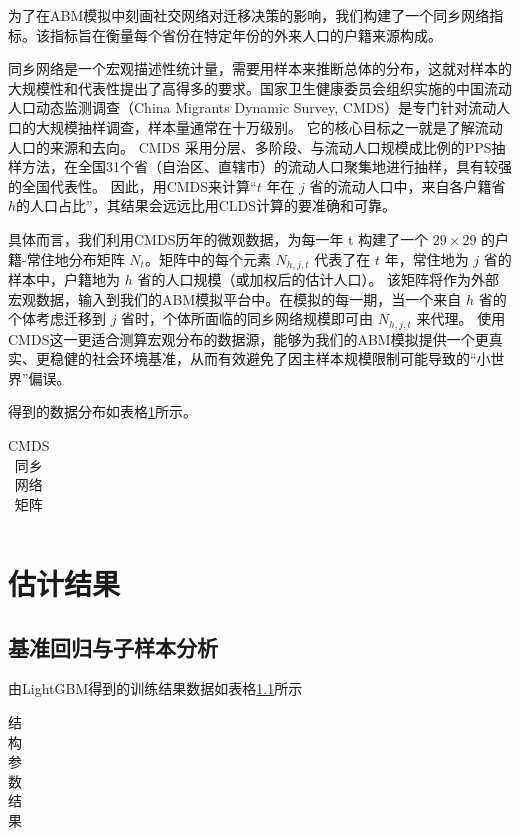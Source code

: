 \documentclass[
  a4paper,
  zihao=-4,
  fontset=mac,
  AutoFakeBold,
  AutoFakeSlant,
  oneside]{ctexbook}
\begin{document}
为了在ABM模拟中刻画社交网络对迁移决策的影响，我们构建了一个同乡网络指标。该指标旨在衡量每个省份在特定年份的外来人口的户籍来源构成。

同乡网络是一个宏观描述性统计量，需要用样本来推断总体的分布，这就对样本的大规模性和代表性提出了高得多的要求。国家卫生健康委员会组织实施的中国流动人口动态监测调查（China Migrants Dynamic Survey, CMDS）是专门针对流动人口的大规模抽样调查，样本量通常在十万级别。
它的核心目标之一就是了解流动人口的来源和去向。
CMDS 采用分层、多阶段、与流动人口规模成比例的PPS抽样方法，在全国31个省（自治区、直辖市）的流动人口聚集地进行抽样，具有较强的全国代表性。
因此，用CMDS来计算“$t$ 年在 $j$ 省的流动人口中，来自各户籍省$h$的人口占比”，其结果会远远比用CLDS计算的要准确和可靠。

具体而言，我们利用CMDS历年的微观数据，为每一年 t 构建了一个 $29 \times 29$ 的户籍-常住地分布矩阵 $N_t$。矩阵中的每个元素 $N_{h,j,t}$ 代表了在 $t$ 年，常住地为 $j$ 省的样本中，户籍地为 $h$ 省的人口规模（或加权后的估计人口）。
该矩阵将作为外部宏观数据，输入到我们的ABM模拟平台中。在模拟的每一期，当一个来自 $h$ 省的个体考虑迁移到 $j$ 省时，个体所面临的同乡网络规模即可由 $N_{h,j,t}$ 来代理。
使用CMDS这一更适合测算宏观分布的数据源，能够为我们的ABM模拟提供一个更真实、更稳健的社会环境基准，从而有效避免了因主样本规模限制可能导致的“小世界”偏误。

得到的数据分布如表格\ref{tab:CMDS同乡网络矩阵}所示。

\begin{table}[!ht]
\centering
\caption{CMDS同乡网络矩阵}
\begin{tabularx}{\textwidth}{@{}cXXX@{}}
\toprule
\midrule
\bottomrule
\end{tabularx}
\label{tab:CMDS同乡网络矩阵}
\end{table}




\chapter{估计结果}

\section{基准回归与子样本分析} %


由LightGBM得到的训练结果数据如表格\ref{tab:机器学习插件训练结果}所示
\begin{table}[!ht]
\centering
\caption{结构参数结果}
\begin{tabularx}{\textwidth}{@{}cXXX@{}}
\toprule
\midrule
\bottomrule
\end{tabularx}
\label{tab:机器学习插件训练结果}
\end{table}
\end{document}
